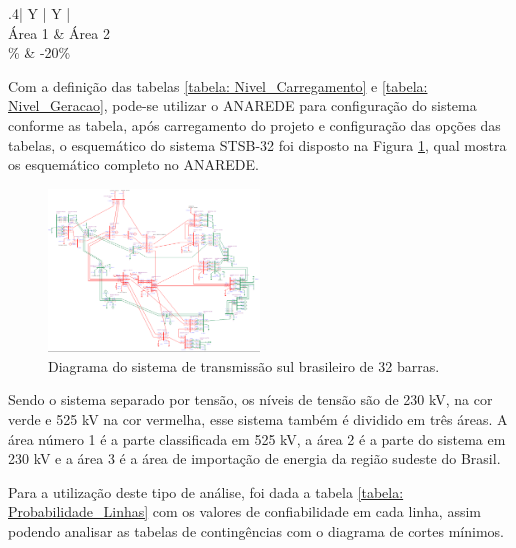 \documentclass[lettersize,journal]{IEEEtran}
\begin{document}
\begin{table}[ht]
	\caption{Configuração do Nível de Carregamento(MW)}
	\label{tabela: Nivel_Geracao}
	\centering
	\begin{tabularx}{.4\textwidth}{| Y | Y |}
		\hline
		 \\
		\hline
		Área 1 & Área 2 \\
		\% & -20\% \\
		\hline
	\end{tabularx}
\end{table}

Com a definição das tabelas \ref{tabela: Nivel_Carregamento} e \ref{tabela: Nivel_Geracao}, pode-se utilizar o ANAREDE\cite{Cabral2020} para configuração do sistema conforme as tabela, após carregamento do projeto e configuração das opções das tabelas, o esquemático do sistema STSB-32 foi disposto na Figura \ref{figura: Sistema_STSB_32}, qual mostra os esquemático completo no ANAREDE.

\begin{figure}[h]
	\includegraphics[width=0.5\textwidth]{Figuras/STSB-32.png}
	\centering
	\caption{Diagrama do sistema de transmissão sul brasileiro de 32 barras.}
	\label{figura: Sistema_STSB_32}
\end{figure}

Sendo o sistema separado por tensão, os níveis de tensão são de 230 kV, na cor verde e 525 kV na cor vermelha, esse sistema também é dividido em três áreas. A área número 1 é a parte classificada em 525 kV, a área 2 é a parte do sistema em 230 kV e a área 3 é a área de importação de energia da região sudeste do Brasil.

Para a utilização deste tipo de análise, foi dada a tabela \ref{tabela: Probabilidade_Linhas} com os valores de confiabilidade em cada linha, assim podendo analisar as tabelas de contingências com o diagrama de cortes mínimos\cite{Guilherme1997}.
\end{document}
